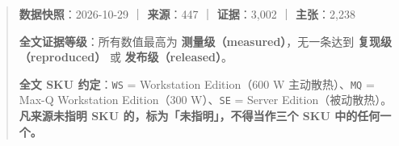 
\begin{quote}\small
\textbf{数据快照}：2026-10-29 ｜ \textbf{来源}：447 ｜ \textbf{证据}：3,002 ｜ \textbf{主张}：2,238

\textbf{全文证据等级}：所有数值最高为 \textbf{测量级（measured）}，无一条达到 \textbf{复现级（reproduced）} 或 \textbf{发布级（released）}。

\textbf{ 全文 SKU 约定}：\texttt{WS} = Workstation Edition（600 W 主动散热）、\texttt{MQ} = Max-Q Workstation Edition（300 W）、\texttt{SE} = Server Edition（被动散热）。\textbf{凡来源未指明 SKU 的，标为「未指明」，不得当作三个 SKU 中的任何一个。}

\end{quote}


\begin{abstract}

本文综述 NVIDIA RTX PRO 6000 Blackwell（GB202，96 GB GDDR7，\texttt{sm\_120a}）在本地大模型推理上的性能表现，并与 RTX 5090、RTX 4090、RTX 6000 Ada 及数据中心加速器对照。我们不按「谁更快」组织材料，而按「这个数字能证明什么」组织。


\textbf{核心发现有八。}


\textbf{第一，预填与解码是两条曲线，差 110 倍，故「这张卡多快」本身有歧义。}同一张卡、同一个模型、同一套 llama.cpp 单流测量：预填 \textbf{4,757 tok/s}，解码 \textbf{43.16 tok/s}。预填瓶颈是算力，解码瓶颈是带宽，两者对硬件的要求几乎正交。三条证据互相印证：同带宽的 RTX 5090 解码持平；功耗从 300 W 翻到 600 W只让预填快约两成、解码几乎不动；互连（PCIe 对 NVLink）只在解码上拉开 66\%。故\textbf{长提示短回答时它是很快的卡，短提示长回答时它是最弱的一维。}而\textbf{首字延迟是第三个维度，与上面两个都不同步}：同一对卡开 EP 让首字从18,355 毫秒降到 673 毫秒（27 倍），吞吐只涨 2.3 倍、TPOT 几乎不变；而 2 张 B200 靠 NVLink 把吞吐做到高 1.66 倍、TPOT 做到低 2.3 倍，首字却是这张卡的 3.7 倍。


\textbf{第二，这个产品名不是一个配置，而是三个。} 同一名字下有 600 W 的 Workstation Edition、300 W 的 Max-Q、以及被动散热的 Server Edition。它们在同一模型同一命令下的解码吞吐差 \textbf{12.9\%-\hspace{0pt}13.1\%}；在同一功耗点（300 W）上 Server 版比 WS 版快 \textbf{38\%}。故「RTX PRO 6000 的 tok/s 是多少」这个问法本身需要先回答「哪个 SKU」。


\textbf{第三，容量不构成约束时，这张卡与消费级旗舰几乎打平。} UL Procyon 四模型文本生成中，WS 版相对 RTX 5090 的 token 速率优势只有 \textbf{1.5\%-\hspace{0pt}5.9\%}；而同一测试的总分差距达 \textbf{8\%-\hspace{0pt}18\%}。同一个测试的两个输出给出两种图景。



\end{abstract}
